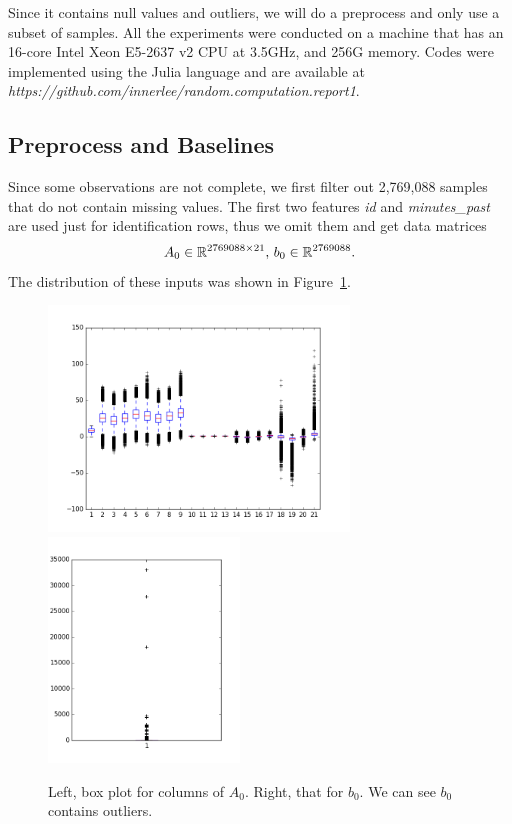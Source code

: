 Since it contains null values and outliers,
we will do a preprocess and only use a subset of samples.
All the experiments were conducted on a machine
that has an 16-core Intel Xeon E5-2637 v2 CPU at 3.5GHz,
and 256G memory.
Codes were implemented using the Julia language
and are available at \emph{https://github.com/innerlee/random.computation.report1}.

\subsection{Preprocess and Baselines} \label{sec:preprocess}

Since some observations are not complete,
we first filter out 2,769,088 samples that do not contain missing values.
The first two features \emph{id} and \emph{minutes\_past}
are used just for identification rows,
thus we omit them and
get data matrices
\begin{equation}
    A_0 \in {\mathbb{R}}^{2769088\times 21}, \,
    b_0\in{\mathbb{R}}^{2769088}.
\end{equation}
The distribution of these inputs was shown in Figure~\ref{fig:box}.
\begin{figure}[htb]
	\centering
	\includegraphics[height=6cm]{fig/box_a_0.png}
	\includegraphics[height=6cm]{fig/box_b_0.png}
	\caption{\small
		Left, box plot for columns of $A_0$.
        Right, that for $b_0$.
        We can see $b_0$ contains outliers.}
	\label{fig:box}
\end{figure}

